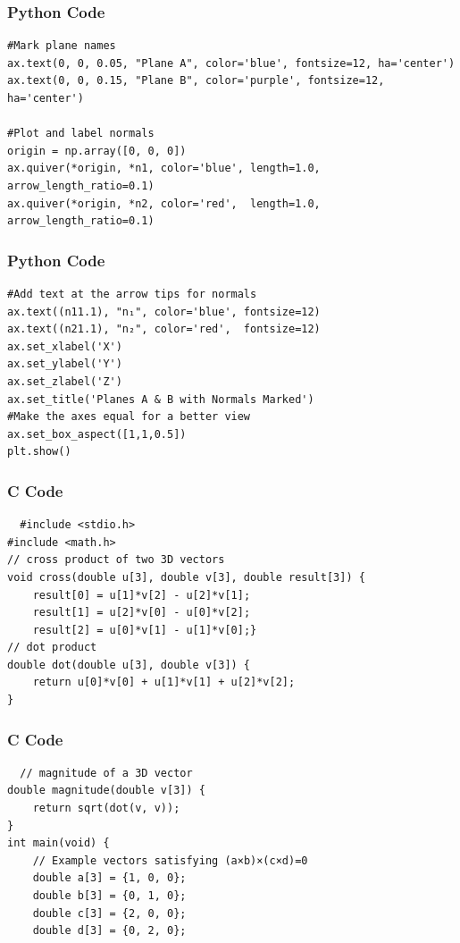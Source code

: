 \documentclass{beamer}
\begin{document}
 
\begin{frame}[fragile]
    \frametitle{Python Code}

    \begin{lstlisting}
#Mark plane names
ax.text(0, 0, 0.05, "Plane A", color='blue', fontsize=12, ha='center')
ax.text(0, 0, 0.15, "Plane B", color='purple', fontsize=12, ha='center')

#Plot and label normals
origin = np.array([0, 0, 0])
ax.quiver(*origin, *n1, color='blue', length=1.0, arrow_length_ratio=0.1)
ax.quiver(*origin, *n2, color='red',  length=1.0, arrow_length_ratio=0.1)
\end{lstlisting}
\end{frame}
\begin{frame}[fragile]
    \frametitle{Python Code}

    \begin{lstlisting}
#Add text at the arrow tips for normals
ax.text((n11.1), "n₁", color='blue', fontsize=12)
ax.text((n21.1), "n₂", color='red',  fontsize=12)
ax.set_xlabel('X')
ax.set_ylabel('Y')
ax.set_zlabel('Z')
ax.set_title('Planes A & B with Normals Marked')
#Make the axes equal for a better view
ax.set_box_aspect([1,1,0.5])
plt.show()
\end{lstlisting}
\end{frame}


\begin{frame}[fragile]
\frametitle{C Code}
\begin{lstlisting}
  #include <stdio.h>
#include <math.h>
// cross product of two 3D vectors
void cross(double u[3], double v[3], double result[3]) {
    result[0] = u[1]*v[2] - u[2]*v[1];
    result[1] = u[2]*v[0] - u[0]*v[2];
    result[2] = u[0]*v[1] - u[1]*v[0];}
// dot product
double dot(double u[3], double v[3]) {
    return u[0]*v[0] + u[1]*v[1] + u[2]*v[2];
}
\end{lstlisting}
\end{frame}

\begin{frame}[fragile]
\frametitle{C Code}
\begin{lstlisting}
  // magnitude of a 3D vector
double magnitude(double v[3]) {
    return sqrt(dot(v, v));
}
int main(void) {
    // Example vectors satisfying (a×b)×(c×d)=0
    double a[3] = {1, 0, 0};
    double b[3] = {0, 1, 0};
    double c[3] = {2, 0, 0};
    double d[3] = {0, 2, 0};
\end{lstlisting}

\end{frame}
\end{document}

